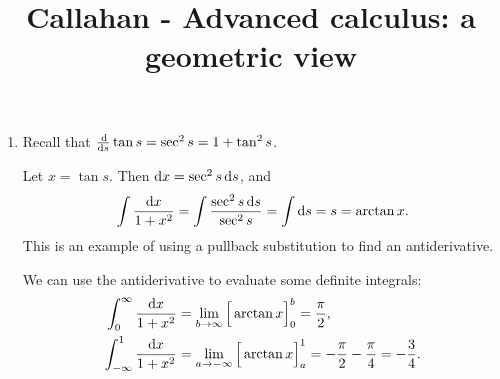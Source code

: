 \documentclass[12pt]{article}
\begin{document}
\title{Callahan - Advanced calculus: a geometric view}
\author{}
\date{}
\maketitle


\begin{enumerate}
\item
  Recall that $\dds \tan s = \sec^2 s = 1 + \tan^2 s$.

  Let $x = \tan s$. Then $\dx = \sec^2 s \ds$, and
  \begin{align*}
      \int \frac{\dx}{1 + x^2}
    = \int \frac{\sec^2 s \ds}{\sec^2 s}
    = \int \ds
    = s
    = \arctan x.
  \end{align*}
  This is an example of using a pullback substitution to find an antiderivative.

  We can use the antiderivative to evaluate some definite integrals:
  \begin{align*}
      \int_0^\infty \frac{\dx}{1 + x^2}
    &= \lim_{b\to\infty}\Big[\arctan x\Big]_0^b
    = \frac{\pi}{2},\\
      \int_{-\infty}^1 \frac{\dx}{1 + x^2}
    &= \lim_{a\to-\infty}\Big[\arctan x\Big]_a^1
    = -\frac{\pi}{2} - \frac{\pi}{4} = -\frac{3}{4}.
  \end{align*}

\end{enumerate}
\end{document}
